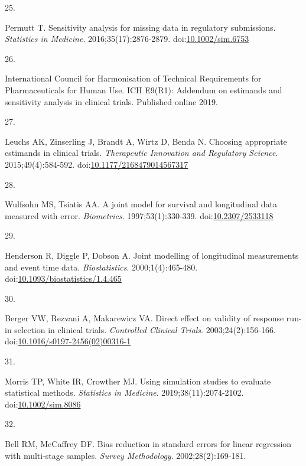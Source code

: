 \documentclass[
  11pt,
]{article}
\newlength{\cslhangindent}
\newlength{\csllabelwidth}
\newenvironment{CSLReferences}[2] %
 {\begin{list}{}{%
  \setlength{\itemindent}{0pt}
  \setlength{\leftmargin}{0pt}
  \setlength{\parsep}{0pt}
  \ifodd #1
   \setlength{\leftmargin}{\cslhangindent}
   \setlength{\itemindent}{-1\cslhangindent}
  \fi
  \setlength{\itemsep}{#2\baselineskip}}}
 {\end{list}}
\newcommand{\CSLLeftMargin}[1]{\parbox[t]{\csllabelwidth}{\strut#1\strut}}
\newcommand{\CSLRightInline}[1]{\parbox[t]{\linewidth - \csllabelwidth}{\strut#1\strut}}
\begin{document}
\begin{CSLReferences}{0}{1}
\CSLLeftMargin{25. }%
\CSLRightInline{Permutt T. Sensitivity analysis for missing data in regulatory submissions. \emph{Statistics in Medicine}. 2016;35(17):2876-2879. doi:\href{https://doi.org/10.1002/sim.6753}{10.1002/sim.6753}}

\CSLLeftMargin{26. }%
\CSLRightInline{International Council for Harmonisation of Technical Requirements for Pharmaceuticals for Human Use. {ICH E9(R1)}: Addendum on estimands and sensitivity analysis in clinical trials. Published online 2019.}

\CSLLeftMargin{27. }%
\CSLRightInline{Leuchs AK, Zinserling J, Brandt A, Wirtz D, Benda N. Choosing appropriate estimands in clinical trials. \emph{Therapeutic Innovation and Regulatory Science}. 2015;49(4):584-592. doi:\href{https://doi.org/10.1177/2168479014567317}{10.1177/2168479014567317}}

\CSLLeftMargin{28. }%
\CSLRightInline{Wulfsohn MS, Tsiatis AA. A joint model for survival and longitudinal data measured with error. \emph{Biometrics}. 1997;53(1):330-339. doi:\href{https://doi.org/10.2307/2533118}{10.2307/2533118}}

\CSLLeftMargin{29. }%
\CSLRightInline{Henderson R, Diggle P, Dobson A. Joint modelling of longitudinal measurements and event time data. \emph{Biostatistics}. 2000;1(4):465-480. doi:\href{https://doi.org/10.1093/biostatistics/1.4.465}{10.1093/biostatistics/1.4.465}}

\CSLLeftMargin{30. }%
\CSLRightInline{Berger VW, Rezvani A, Makarewicz VA. Direct effect on validity of response run-in selection in clinical trials. \emph{Controlled Clinical Trials}. 2003;24(2):156-166. doi:\href{https://doi.org/10.1016/s0197-2456(02)00316-1}{10.1016/s0197-2456(02)00316-1}}

\CSLLeftMargin{31. }%
\CSLRightInline{Morris TP, White IR, Crowther MJ. Using simulation studies to evaluate statistical methods. \emph{Statistics in Medicine}. 2019;38(11):2074-2102. doi:\href{https://doi.org/10.1002/sim.8086}{10.1002/sim.8086}}

\CSLLeftMargin{32. }%
\CSLRightInline{Bell RM, McCaffrey DF. Bias reduction in standard errors for linear regression with multi-stage samples. \emph{Survey Methodology}. 2002;28(2):169-181.}

\end{CSLReferences}
\end{document}
